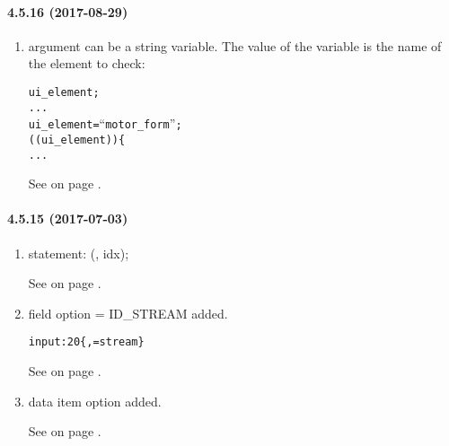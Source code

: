 \paragraph{4.5.16 (2017-08-29)}
\begin{enumerate}

\item \VISIBLE{} argument can be a string variable. The value of the variable is the name of the element
  to check: \\
  \begin{boxedminipage}[t]{\linewidth}
    \begin{alltt}
  \STRING{} ui\_element;
  ...
  ui\_element = ``motor\_form'';
  \IF (\VISIBLE(ui\_element)) \{
    ...
    \end{alltt}
  \end{boxedminipage}

  See  on page \pageref{dia:jobvisibleaction}.

\end{enumerate}
\paragraph{4.5.15 (2017-07-03)}
\begin{enumerate}

\item \INDEX{} statement: \INDEX(\THIS, idx);

  See  on page \pageref{dia:datastatement}.

\item \FIELDGROUP{} field option \HELPTEXT{} = ID\_STREAM added. \\
  \begin{boxedminipage}[t]{\linewidth}
    \begin{alltt}
    input:20 \{, \HELPTEXT=stream\}
    \end{alltt}
  \end{boxedminipage}

  See  on page \pageref{dia:uifieldadditionalattributes}.

\item \DATAPOOL{} data item option \PLACEHOLDER{} added.

  See  on page \pageref{dia:dataitemoptions}.

\end{enumerate}
